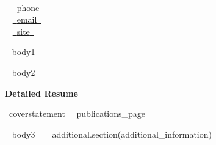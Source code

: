 \documentclass[a4paper]{article}
\newcommand{\block}[1]{\hrule \vspace{0.2cm} \textbf{\Large #1} \vspace{0.2cm}}
\newcommand{\blockNp}[1]{\newpage \textbf{\Large #1} \vspace{0.2cm}}
\newcommand{\skill}[2]{\textbf{#1} \hfill #2 \\}
\begin{document}
\begin{minipage}[c]{0.6\columnwidth}
    \\
\end{minipage} 
\hfill
\begin{minipage}[t]{0.35\columnwidth}
    \skill{\faPhone~}{~{{phone}}~}
    \skill{\faEnvelope~}{\href{mailto:~{{email}}~}{~{{email}}~}}
    \skill{\faGlobe~}{\href{~{{site}}~}{~{{site}}~}}
\end{minipage}
\vspace{-0.25em}

\begin{minipage}[t]{0.6\columnwidth}
    ~{{ body1 }}~
\end{minipage} 
\hfill
\begin{minipage}[t]{0.375\columnwidth}
    ~{{ body2 }}~
\end{minipage}




\blockNp{Detailed Resume}

{~{{coverstatement}}~}
\vspace{1em}
{~{{publications_page}}~}

\vspace{1em}


~{{ body3 }}~
~{{ additional.section(additional_information) }}~
\end{document}
